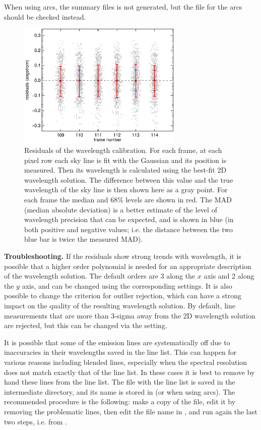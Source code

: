 \documentclass[a4paper]{article}
\begin{document}
\begin{sloppypar}
When using arcs, the summary files is not generated, but the  file for the arcs should be checked instead.

\begin{figure}[tbp]
\centering
\includegraphics[width=0.7\textwidth]{residuals}
\caption{Residuals of the wavelength calibration. For each frame, at each pixel row each sky line is fit with the Gaussian and its position is measured. Then its wavelength is calculated using the best-fit 2D wavelength solution. The difference between this value and the true wavelength of the sky line is then shown here as a gray point. For each frame the median and 68\% levels are shown in red. The MAD (median absolute deviation) is a better estimate of the level of wavelength precision that can be expected, and is shown in blue (in both positive and negative values; i.e. the distance between the two blue bar is twice the measured MAD).}
\label{fig:residuals}
\end{figure}


\medskip
\noindent
\textbf{Troubleshooting.} If the residuals show strong trends with wavelength, it is possible that a higher order polynomial is needed for an appropriate description of the wavelength solution. The default orders are 3 along the $x$ axis and 2 along the $y$ axis, and can be changed using the corresponding settings. It is also possible to change the criterion for outlier rejection, which can have a strong impact on the quality of the resulting wavelength solution. By default, line measurements that are more than 3-sigma away from the 2D wavelength solution are rejected, but this can be changed via the  setting.

It is possible that some of the emission lines are systematically off due to inaccuracies in their wavelengths saved in the line list. This can happen for various reasons including blended lines, especially when the spectral resolution does not match exactly that of the line list. In these cases it is best to remove by hand these lines from the line list. The file with the line list is saved in the intermediate directory, and its name is stored in  (or  when using arcs). The recommended procedure is the following: make a copy of the file, edit it by removing the problematic lines, then edit the file name in , and run again the last two steps, i.e. from .


\end{sloppypar}
\end{document}

